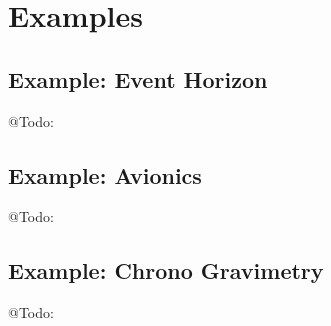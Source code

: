 \section{Examples}
\label{sec:examples}

\subsection{Example: Event Horizon}
\label{sec:example_event_horizon}
 
@Todo:  

\subsection{Example: Avionics}
\label{sec:example_avionics}

@Todo:  

\subsection{Example: Chrono Gravimetry}
\label{sec:example_chronogravimetry}

@Todo:  

\newpage